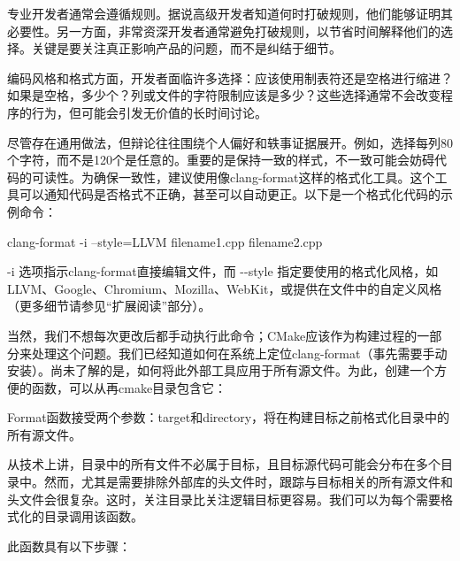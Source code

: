 专业开发者通常会遵循规则。据说高级开发者知道何时打破规则，他们能够证明其必要性。另一方面，非常资深开发者通常避免打破规则，以节省时间解释他们的选择。关键是要关注真正影响产品的问题，而不是纠结于细节。

编码风格和格式方面，开发者面临许多选择：应该使用制表符还是空格进行缩进？如果是空格，多少个？列或文件的字符限制应该是多少？这些选择通常不会改变程序的行为，但可能会引发无价值的长时间讨论。

尽管存在通用做法，但辩论往往围绕个人偏好和轶事证据展开。例如，选择每列80个字符，而不是120个是任意的。重要的是保持一致的样式，不一致可能会妨碍代码的可读性。为确保一致性，建议使用像clang-format这样的格式化工具。这个工具可以通知代码是否格式不正确，甚至可以自动更正。以下是一个格式化代码的示例命令：

\begin{shell}
clang-format -i --style=LLVM filename1.cpp filename2.cpp
\end{shell}


-i 选项指示clang-format直接编辑文件，而 -{}-style 指定要使用的格式化风格，如LLVM、Google、Chromium、Mozilla、WebKit，或提供在文件中的自定义风格（更多细节请参见“扩展阅读”部分）。

当然，我们不想每次更改后都手动执行此命令；CMake应该作为构建过程的一部分来处理这个问题。我们已经知道如何在系统上定位clang-format（事先需要手动安装）。尚未了解的是，如何将此外部工具应用于所有源文件。为此，创建一个方便的函数，可以从再cmake目录包含它：



Format函数接受两个参数：target和directory，将在构建目标之前格式化目录中的所有源文件。

从技术上讲，目录中的所有文件不必属于目标，且目标源代码可能会分布在多个目录中。然而，尤其是需要排除外部库的头文件时，跟踪与目标相关的所有源文件和头文件会很复杂。这时，关注目录比关注逻辑目标更容易。我们可以为每个需要格式化的目录调用该函数。

此函数具有以下步骤：


